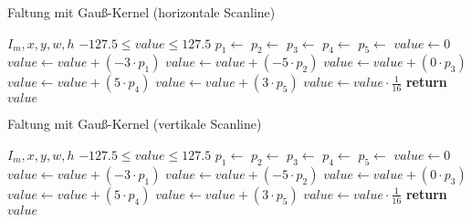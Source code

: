 \begin{algorithm}[ht]
\caption{Faltung mit Gauß-Kernel (horizontale Scanline)}
\label{alg:derivativeofgauss-horizontal}
\begin{algorithmic}[1]
	\Require $I_m,x,y,w,h$
	\Ensure $-127.5 \leq value \leq 127.5$
	\State $p_1 \gets$ 
	\State $p_2 \gets$ 
	\State $p_3 \gets$ 
	\State $p_4 \gets$ 
	\State $p_5 \gets$ 
	\State $value \gets 0$
	\State $value \gets value + \left( -3 \cdot p_1 \right)$
	\State $value \gets value + \left( -5 \cdot p_2 \right)$
	\State $value \gets value + \left( 0 \cdot p_3 \right)$
	\State $value \gets value + \left( 5 \cdot p_4 \right)$
	\State $value \gets value + \left( 3 \cdot p_5 \right)$
	\State $value \gets value \cdot \frac{1}{16}$
	\State \textbf{return} $value$
\end{algorithmic}
\end{algorithm}

\begin{algorithm}[ht]
\caption{Faltung mit Gauß-Kernel (vertikale Scanline)}
\label{alg:derivativeofgauss-vertical}
\begin{algorithmic}[1]
	\Require $I_m,x,y,w,h$
	\Ensure $-127.5 \leq value \leq 127.5$
	\State $p_1 \gets$ 
	\State $p_2 \gets$ 
	\State $p_3 \gets$ 
	\State $p_4 \gets$ 
	\State $p_5 \gets$ 
	\State $value \gets 0$
	\State $value \gets value + \left( -3 \cdot p_1 \right)$
	\State $value \gets value + \left( -5 \cdot p_2 \right)$
	\State $value \gets value + \left( 0 \cdot p_3 \right)$
	\State $value \gets value + \left( 5 \cdot p_4 \right)$
	\State $value \gets value + \left( 3 \cdot p_5 \right)$
	\State $value \gets value \cdot \frac{1}{16}$
	\State \textbf{return} $value$
\end{algorithmic}
\end{algorithm}
